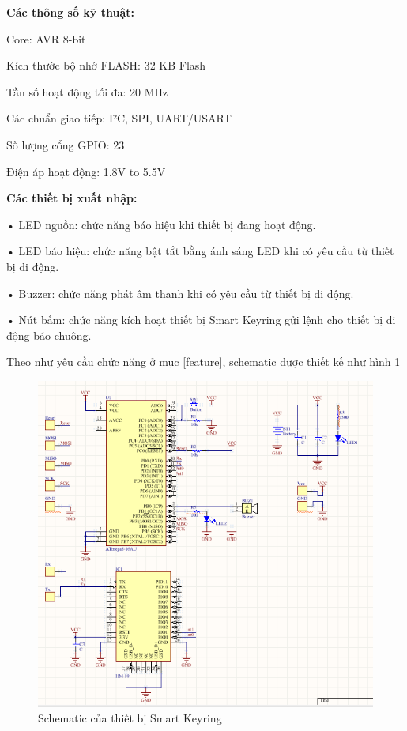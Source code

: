 \textbf{Các thông số kỹ thuật:}

Core:	 AVR 8-bit

Kích thước bộ nhớ FLASH:	 32 KB Flash

Tần số hoạt động tối đa:	 20 MHz

Các chuẩn giao tiếp:	 I²C, SPI, UART/USART

Số lượng cổng GPIO:	 23

Điện áp hoạt động:	 1.8V to 5.5V

\textbf{Các thiết bị xuất nhập:}

• LED nguồn: chức năng báo hiệu khi thiết bị đang hoạt động.

• LED báo hiệu: chức năng bật tắt bằng ánh sáng LED khi có yêu cầu từ thiết bị di động.

• Buzzer: chức năng phát âm thanh khi có yêu cầu từ thiết bị di động.

• Nút bấm: chức năng kích hoạt thiết bị Smart Keyring gửi lệnh cho thiết bị di động báo chuông.

Theo như yêu cầu chức năng ở mục \ref{feature}, schematic được thiết kế như hình \ref{fig: schematic}

	\begin{figure}[H]
		\centering    
		\includegraphics[width=1.0\textwidth]{schematic}
		\caption[Schematic của thiết bị Smart Keyring]{Schematic của thiết bị Smart Keyring}
		\label{fig: schematic}
	\end{figure}


